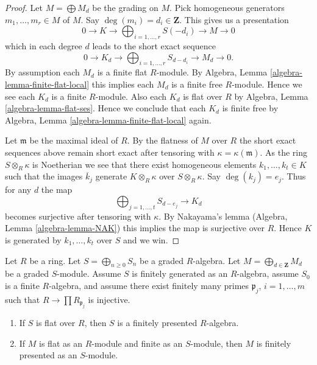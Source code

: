 \begin{proof}
Let $M = \bigoplus M_d$ be the grading on $M$.
Pick homogeneous generators $m_1, \ldots, m_r \in M$ of $M$.
Say $\deg(m_i) = d_i \in \mathbf{Z}$. This gives us a presentation
$$
0 \to K \to \bigoplus\nolimits_{i = 1, \ldots, r} S(-d_i) \to M \to 0
$$
which in each degree $d$ leads to the short exact sequence
$$
0 \to K_d \to \bigoplus\nolimits_{i = 1, \ldots, r} S_{d - d_i} \to
M_d \to 0.
$$
By assumption each $M_d$ is a finite flat $R$-module. By
Algebra, Lemma \ref{algebra-lemma-finite-flat-local}
this implies each $M_d$ is a finite free $R$-module. Hence
we see each $K_d$ is a finite $R$-module. Also each $K_d$ is flat
over $R$ by
Algebra, Lemma \ref{algebra-lemma-flat-ses}.
Hence we conclude that each $K_d$ is finite free by 
Algebra, Lemma \ref{algebra-lemma-finite-flat-local}
again.

\medskip\noindent
Let $\mathfrak m$ be the maximal ideal of $R$. By the flatness of $M$
over $R$ the short exact sequences above remain short exact after tensoring
with $\kappa = \kappa(\mathfrak m)$. As the ring $S \otimes_R \kappa$ is
Noetherian we see that there exist homogeneous elements
$k_1, \ldots, k_t \in K$ such that the images $\overline{k}_j$
generate $K \otimes_R \kappa$ over $S \otimes_R \kappa$. Say $\deg(k_j) = e_j$.
Thus for any $d$ the map
$$
\bigoplus\nolimits_{j = 1, \ldots, t} S_{d - e_j}
\longrightarrow
K_d
$$
becomes surjective after tensoring with $\kappa$. By
Nakayama's lemma
(Algebra, Lemma \ref{algebra-lemma-NAK})
this implies the map is surjective over $R$. Hence $K$ is generated
by $k_1, \ldots, k_t$ over $S$ and we win.
\end{proof}

\begin{lemma}
\label{lemma-flat-graded-finite-type-finite-presentation}
Let $R$ be a ring. Let $S = \bigoplus_{n \geq 0} S_n$ be a graded $R$-algebra.
Let $M = \bigoplus_{d \in \mathbf{Z}} M_d$ be a graded $S$-module.
Assume $S$ is finitely generated as an $R$-algebra, assume $S_0$ is a finite
$R$-algebra, and assume there exist finitely many primes
$\mathfrak p_j$, $i = 1, \ldots, m$ such that
$R \to \prod R_{\mathfrak p_j}$ is injective.
\begin{enumerate}
\item If $S$ is flat over $R$, then $S$ is a finitely presented $R$-algebra.
\item If $M$ is flat as an $R$-module and finite as an $S$-module,
then $M$ is finitely presented as an $S$-module.
\end{enumerate}
\end{lemma}


